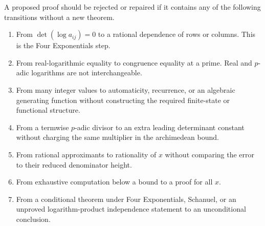 \documentclass[11pt,oneside]{article}
\theoremstyle{definition}
\theoremstyle{remark}
\begin{document}
A proposed proof should be rejected or repaired if it contains any of the
following transitions without a new theorem.
\begin{enumerate}[label=(\arabic*)]
\item From $\det(\log a_{ij})=0$ to a rational dependence of rows or columns.
  This is the Four Exponentials step.
\item From real-logarithmic equality to congruence equality at a prime.
  Real and $p$-adic logarithms are not interchangeable.
\item From many integer values to automaticity, recurrence, or an algebraic
  generating function without constructing the required finite-state or
  functional structure.
\item From a termwise $p$-adic divisor to an extra leading determinant
  constant without charging the same multiplier in the archimedean bound.
\item From rational approximants to rationality of $x$ without comparing the
  error to their reduced denominator height.
\item From exhaustive computation below a bound to a proof for all $x$.
\item From a conditional theorem under Four Exponentials, Schanuel, or an
  unproved logarithm-product independence statement to an unconditional
  conclusion.
\end{enumerate}
\end{document}
